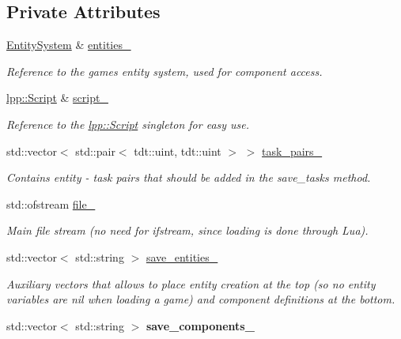 \subsection*{Private Attributes}
\begin{DoxyCompactItemize}
\item 
\hyperlink{class_entity_system}{Entity\+System} \& \hyperlink{class_game_serializer_a28c5d447a195faa9da04f19b26617b16}{entities\+\_\+}
\begin{DoxyCompactList}\small\item\em Reference to the game\textquotesingle{}s entity system, used for component access. \end{DoxyCompactList}\item 
\hyperlink{classlpp_1_1_script}{lpp\+::\+Script} \& \hyperlink{class_game_serializer_a96a50f04014f8378c8cb30321107ef25}{script\+\_\+}
\begin{DoxyCompactList}\small\item\em Reference to the \hyperlink{classlpp_1_1_script}{lpp\+::\+Script} singleton for easy use. \end{DoxyCompactList}\item 
std\+::vector$<$ std\+::pair$<$ tdt\+::uint, tdt\+::uint $>$ $>$ \hyperlink{class_game_serializer_a556001cdf90fde90c842100db0cda29a}{task\+\_\+pairs\+\_\+}
\begin{DoxyCompactList}\small\item\em Contains entity -\/ task pairs that should be added in the save\+\_\+tasks method. \end{DoxyCompactList}\item 
std\+::ofstream \hyperlink{class_game_serializer_a85c282b5993050dba19dc760ea33b536}{file\+\_\+}
\begin{DoxyCompactList}\small\item\em Main file stream (no need for ifstream, since loading is done through Lua). \end{DoxyCompactList}\item 
std\+::vector$<$ std\+::string $>$ \hyperlink{class_game_serializer_a0f6b379c053d77bb9df6bc8004280ccd}{save\+\_\+entities\+\_\+}
\begin{DoxyCompactList}\small\item\em Auxiliary vectors that allows to place entity creation at the top (so no entity variables are nil when loading a game) and component definitions at the bottom. \end{DoxyCompactList}\item 
std\+::vector$<$ std\+::string $>$ {\bfseries save\+\_\+components\+\_\+}\hypertarget{class_game_serializer_a7b64dc19195f0fe7796cb15765162a0f}{}\label{class_game_serializer_a7b64dc19195f0fe7796cb15765162a0f}


\end{DoxyCompactItemize}
